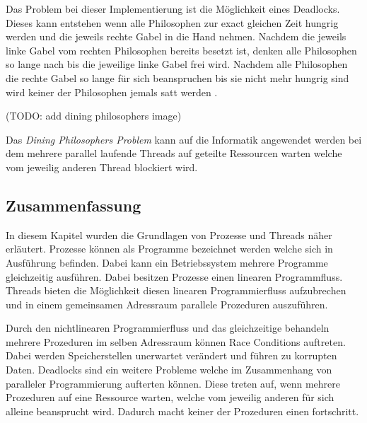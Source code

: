 Das Problem bei dieser Implementierung ist die Möglichkeit eines Deadlocks. Dieses kann entstehen wenn alle Philosophen zur exact gleichen Zeit hungrig werden und die jeweils rechte Gabel in die Hand nehmen. Nachdem die jeweils linke Gabel vom rechten Philosophen bereits besetzt ist, denken alle Philosophen so lange nach bis die jeweilige linke Gabel frei wird. Nachdem alle Philosophen die rechte Gabel so lange für sich beanspruchen bis sie nicht mehr hungrig sind wird keiner der Philosophen jemals satt werden \cite[p. 21]{dij71}. 

(TODO: add dining philosophers image)

Das \emph{Dining Philosophers Problem} kann auf die Informatik angewendet werden bei dem mehrere parallel laufende Threads auf geteilte Ressourcen warten welche vom jeweilig anderen Thread blockiert wird.

\subsection{Zusammenfassung}
In diesem Kapitel wurden die Grundlagen von Prozesse und Threads näher erläutert. Prozesse können als Programme bezeichnet werden welche sich in Ausführung befinden. Dabei kann ein Betriebssystem mehrere Programme gleichzeitig ausführen. Dabei besitzen Prozesse einen linearen Programmfluss. Threads bieten die Möglichkeit diesen linearen Programmierfluss aufzubrechen und in einem gemeinsamen Adressraum parallele Prozeduren auszuführen. 

Durch den nichtlinearen Programmierfluss und das gleichzeitige behandeln mehrere Prozeduren im selben Adressraum können Race Conditions auftreten. Dabei werden Speicherstellen unerwartet verändert und führen zu korrupten Daten. Deadlocks sind ein weitere Probleme welche im Zusammenhang von paralleler Programmierung aufterten können. Diese treten auf, wenn mehrere Prozeduren auf eine Ressource warten, welche vom jeweilig anderen für sich alleine beansprucht wird. Dadurch macht keiner der Prozeduren einen fortschritt. 
